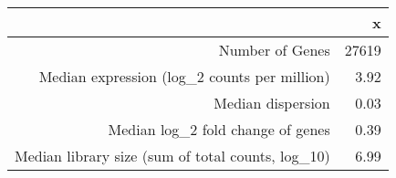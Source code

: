 \begin{table}[ht]
\centering
\begin{tabular}{rr}
  \hline
 & x \\ 
  \hline
Number of Genes & 27619 \\ 
  Median expression (log_2 counts per million) & 3.92 \\ 
  Median dispersion & 0.03 \\ 
  Median log_2 fold change of genes & 0.39 \\ 
  Median library size (sum of total counts, log_{10}) & 6.99 \\ 
   \hline
\end{tabular}
\end{table}